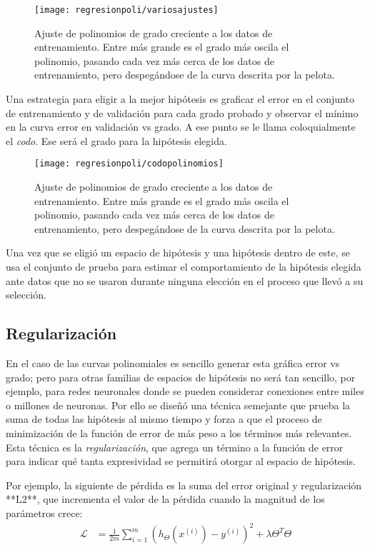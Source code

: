 \begin{figure}
 \centering
 \texttt{[image: regresionpoli/variosajustes]}
 \caption{Ajuste de polinomios de grado creciente a los datos de entrenamiento.  Entre más grande es el grado más oscila el polinomio, pasando cada vez más cerca de los datos de entrenamiento, pero despegándose de la curva descrita por la pelota.}\label{fig:variosajustes}
\end{figure}


Una estrategia para eligir a la mejor hipótesis es graficar el error en el conjunto de entrenamiento y de validación para cada grado probado y observar el mínimo en la curva error en validación vs grado.  A ese punto se le llama coloquialmente el \textit{codo}.  Ese será el grado para la hipótesis elegida.

\begin{figure}
 \centering
 \texttt{[image: regresionpoli/codopolinomios]}
 \caption{Ajuste de polinomios de grado creciente a los datos de entrenamiento.  Entre más grande es el grado más oscila el polinomio, pasando cada vez más cerca de los datos de entrenamiento, pero despegándose de la curva descrita por la pelota.}\label{fig:codopolinomios}
\end{figure}

Una vez que se eligió un espacio de hipótesis y una hipótesis dentro de este, se usa el conjunto de prueba para estimar el comportamiento de la hipótesis elegida ante datos que no se usaron durante ninguna elección en el proceso que llevó a su selección.


\subsection{Regularización}

En el caso de las curvas polinomiales es sencillo generar esta gráfica error vs grado; pero para otras familias de espacios de hipótesis no será tan sencillo, por ejemplo, para redes neuronales donde se pueden considerar conexiones entre miles o millones de neuronas.  Por ello se diseñó una técnica semejante que prueba la suma de todas las hipótesis al mismo tiempo y forza a que el proceso de minimización de la función de error de más peso a los términos más relevantes.  Esta técnica es la \emph{regularización}, que agrega un término a la función de error para indicar qué tanta expresividad se permitirá otorgar al espacio de hipótesis.

Por ejemplo, la siguiente de pérdida es la suma del error original y regularización **L2**, que incrementa el valor de la pérdida cuando la magnitud de los parámetros crece:
\begin{align}
 \mathcal{L} &= \frac{1}{2m} \sum_{i=1}^{m} (h_{\Theta}(x^{(i)})-y^{(i)})^2 + \lambda \Theta^T\Theta
\end{align}

